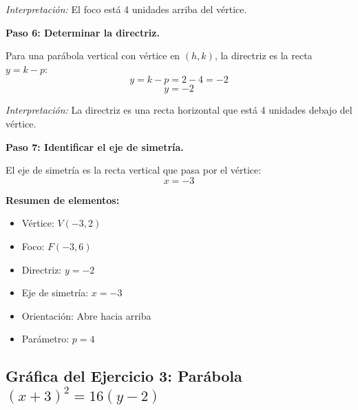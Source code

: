 \documentclass[12pt,a4paper]{article}
\begin{document}
	\emph{Interpretación:} El foco está 4 unidades arriba del vértice.

	\bigskip

	\textbf{Paso 6: Determinar la directriz.}

	Para una parábola vertical con vértice en \((h,k)\), la directriz es la recta \(y=k-p\):
	\[
	y=k-p=2-4=-2
	\]
	\[
	\boxed{y=-2}
	\]

	\emph{Interpretación:} La directriz es una recta horizontal que está 4 unidades debajo del vértice.

	\bigskip

	\textbf{Paso 7: Identificar el eje de simetría.}

	El eje de simetría es la recta vertical que pasa por el vértice:
	\[
	x=-3
	\]

	\bigskip

	\textbf{Resumen de elementos:}
	\begin{itemize}
		\item Vértice: \(V(-3,2)\)
		\item Foco: \(F(-3,6)\)
		\item Directriz: \(y=-2\)
		\item Eje de simetría: \(x=-3\)
		\item Orientación: Abre hacia arriba
		\item Parámetro: \(p=4\)
	\end{itemize}

	\subsection*{Gráfica del Ejercicio 3: Parábola \((x+3)^2=16(y-2)\)}
\end{document}
